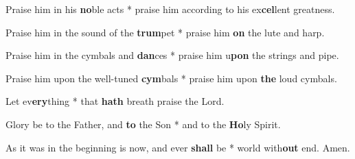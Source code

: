 \begin{multicols}{2}
	Praise him in his \textbf{no}ble acts * praise him according to his ex\textbf{cel}lent greatness.
	
	Praise him in the sound of the \textbf{trum}pet * praise him \textbf{on} the lute and harp.
	
	Praise him in the cymbals and \textbf{dan}ces * praise him u\textbf{pon} the strings and pipe.
	
	Praise him upon the well-tuned \textbf{cym}bals * praise him upon \textbf{the} loud cymbals.
	
	Let ev\textbf{ery}thing * that \textbf{hath} breath praise the Lord.
	
	Glory be to the Father, and \textbf{to} the Son * and to the \textbf{Ho}ly Spirit.
	
	As it was in the beginning is now, and ever \textbf{shall} be * world with\textbf{out} end. Amen.
\end{multicols}